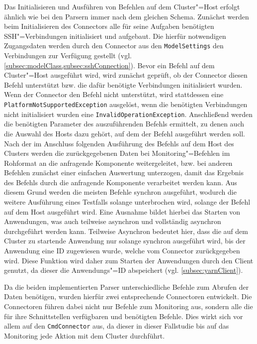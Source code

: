 Das Initialisieren und Ausführen von Befehlen auf dem Cluster"=Host erfolgt ähnlich wie bei den Parsern immer nach dem gleichen Schema.
Zunächst werden beim Initialisieren des Connectors alle für seine Aufgaben benötigten SSH"=Verbindungen initialisiert und aufgebaut.
Die hierfür notwendigen Zugangsdaten werden durch den Connector aus den \texttt{ModelSettings} den Verbindungen zur Verfügung gestellt (vgl. \cref{subsec:modelClass,subsec:sshConnection}).
Bevor ein Befehl auf dem Cluster"=Host ausgeführt wird, wird zunächst geprüft, ob der Connector diesen Befehl unterstützt bzw. die dafür benötigte Verbindungen initialisiert wurden.
Wenn der Connector den Befehl nicht unterstützt, wird stattdessen eine \texttt{PlatformNotSupportedException} ausgelöst, wenn die benötigten Verbindungen nicht initialisiert wurden eine \texttt{InvalidOperationException}.
Anschließend werden die benötigten Parameter des auszuführenden Befehls ermittelt, zu denen auch die Auswahl des Hosts dazu gehört, auf dem der Befehl ausgeführt werden soll.
Nach der im Anschluss folgenden Ausführung des Befehls auf dem Host des Clusters werden die zurückgegebenen Daten bei Monitoring"=Befehlen im Rohformat an die anfragende Komponente weitergeleitet, bzw. bei anderen Befehlen zunächst einer einfachen Auswertung unterzogen, damit das Ergebnis des Befehls durch die anfragende Komponente verarbeitet werden kann.
Aus diesem Grund werden die meisten Befehle synchron ausgeführt, wodurch die weitere Ausführung eines Testfalls solange unterbrochen wird, solange der Befehl auf dem Host ausgeführt wird.
Eine Ausnahme bildet hierbei das Starten von Anwendungen, was auch teilweise asynchron und vollständig asynchron durchgeführt werden kann.
Teilweise Asynchron bedeutet hier, dass die auf dem Cluster zu startende Anwendung nur solange synchron ausgeführt wird, bis der Anwendung eine ID zugewiesen wurde, welche vom Connector zurückgegeben wird.
Diese Funktion wird daher zum Starten der Anwendungen durch den Client genutzt, da dieser die Anwendungs"=ID abspeichert (vgl. \cref{subsec:yarnClient}).

Da die beiden implementierten Parser unterschiedliche Befehle zum Abrufen der Daten benötigen, wurden hierfür zwei entsprechende Connectoren entwickelt.
Die Connectoren führen dabei nicht nur Befehle zum Monitoring aus, sondern alle die für ihre Schnittstellen verfügbaren und benötigten Befehle.
Dies wirkt sich vor allem auf den \texttt{CmdConnector} aus, da dieser in dieser Fallstudie bis auf das Monitoring jede Aktion mit dem Cluster durchführt.

